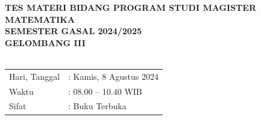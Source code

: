 \documentclass[10pt,a4paper]{article}
\begin{document}



\begin{center}
  \vspace{0.2cm}
  \textbf{TES MATERI BIDANG PROGRAM STUDI MAGISTER MATEMATIKA} \\
  \textbf{SEMESTER GASAL 2024/2025} \\
  \textbf{GELOMBANG III}\\~\\

  \begin{tabular}{l l}
    Hari, Tanggal & : Kamis, 8 Agustus 2024 \\
    Waktu         & : 08.00 -- 10.40 WIB    \\
    Sifat         & : Buku Terbuka
  \end{tabular}

\end{center}

\end{document}
